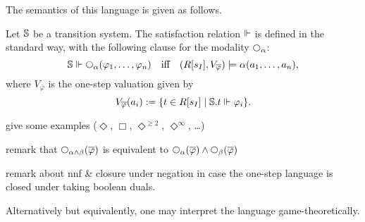The semantics of this language is given as follows.

\begin{definition}
Let $\mathbb{S}$ be a transition system.
The satisfaction relation $\Vdash$ is defined in the standard way, with the 
following clause for the modality $\nxt{\alpha}$:
$$
\model \mmodels \nxt{\al}(\varphi_{1},\ldots,\varphi_{n})
\quad\text{iff}\quad 
(R[s_{I}],V_{\overline{\varphi}}) \models \al(a_{1},\ldots,a_{n}),
$$
where $V_{\overline{\varphi}}$ is the one-step valuation given by 
\[
V_{\overline{\varphi}}(a_{i}) \mathrel{:=} 
  \{ t \in R[s_{I}] \mid \mathbb{S}.t \Vdash \varphi_{i}\}.
\]
\end{definition}

% 

\btbs
\item
give some examples ($\Diamond$, $\Box$, $\Diamond^{\geq 2}$, 
$\Diamond^{\infty}$, \ldots)
\item
remark that $\nxt{\alpha\land\beta}(\ol{\phi})$ is equivalent to
$\nxt{\alpha}(\ol{\phi}) \land \nxt{\beta}(\ol{\phi})$
\item
remark about nnf \& closure under negation in case the one-step 
language is closed under taking boolean duals.
\etbs

Alternatively but equivalently, one may interpret the language
game-theoretically.

